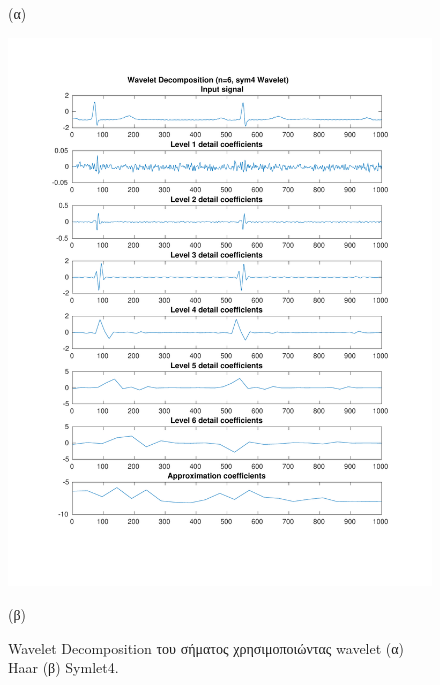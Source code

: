 \documentclass[11pt,a4paper]{article}
\begin{document}
\begin{figure}[H]
\begin{minipage}{0.48\textwidth}
	(α)
\end{minipage}
\begin{minipage}{0.48\textwidth}
	\centering
	\includegraphics[width=\textwidth]{fig/123l1_dwt2.pdf}
	
	(β)
\end{minipage}
\vfill
\caption{Wavelet Decomposition του σήματος χρησιμοποιώντας wavelet (α) Haar (β) Symlet4.}
\label{fig:123l1_dwt}
\end{figure}
\end{document}
